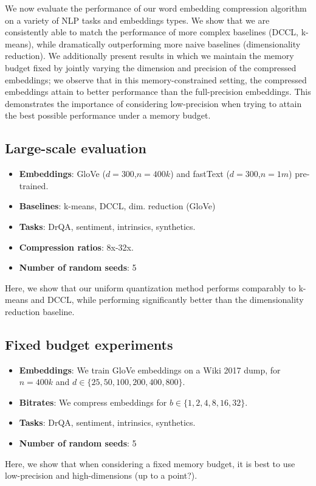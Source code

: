We now evaluate the performance of our word embedding compression algorithm on a variety of NLP tasks and embeddings types.
We show that we are consistently able to match the performance of more complex baselines (DCCL, k-means), while dramatically outperforming more naive baselines (dimensionality reduction).
We additionally present results in which we maintain the memory budget fixed by  jointly varying the dimension and precision of the compressed embeddings;
we observe that in this memory-constrained setting, the compressed embeddings attain  to  better performance than the full-precision embeddings.
This demonstrates the importance of considering low-precision when trying to attain the best possible performance under a memory budget.

\subsection{Large-scale evaluation}
\begin{itemize}
	\item \textbf{Embeddings}: GloVe ($d=300$,$n=400k$) and fastText ($d=300$,$n=1m$) pre-trained.
	\item \textbf{Baselines}: k-means, DCCL, dim. reduction (GloVe)
	\item \textbf{Tasks}: DrQA, sentiment, intrinsics, synthetics.
	\item \textbf{Compression ratios}: 8x-32x.
	\item \textbf{Number of random seeds}: 5
\end{itemize}

Here, we show that our uniform quantization method performs comparably to k-means and DCCL, while performing significantly better than the dimensionality reduction baseline.

\subsection{Fixed budget experiments}
\begin{itemize}
	\item \textbf{Embeddings}: We train GloVe embeddings on a Wiki 2017 dump, for $n=400k$ and $d \in \{25,50,100,200,400,800\}$.
	\item \textbf{Bitrates}: We compress embeddings for $b \in \{1,2,4,8,16,32\}$.
	\item \textbf{Tasks}: DrQA, sentiment, intrinsics, synthetics.
	\item \textbf{Number of random seeds}: 5
\end{itemize}

Here, we show that when considering a fixed memory budget, it is best to use low-precision and high-dimensions (up to a point?).